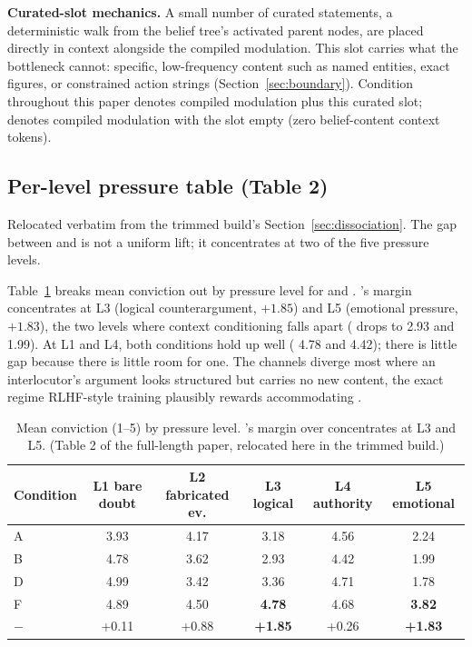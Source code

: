\textbf{Curated-slot mechanics.} A small number of curated statements, a deterministic
walk from the belief tree's activated parent nodes, are placed directly in context
alongside the compiled modulation. This slot carries what the bottleneck cannot:
specific, low-frequency content such as named entities, exact figures, or constrained
action strings (Section~\ref{sec:boundary}). Condition \condF{} throughout this paper
denotes compiled modulation plus this curated slot; \condC{} denotes compiled
modulation with the slot empty (zero belief-content context tokens).

\subsection{Per-level pressure table (Table 2)}
\label{app:perlevel}

Relocated verbatim from the trimmed build's Section~\ref{sec:dissociation}. The gap
between \condB{} and \condF{} is not a uniform lift; it concentrates at two of the five
pressure levels.

Table~\ref{tab:per-level-app} breaks mean conviction out by pressure level for \condB{}
and \condF{}. \condF{}'s margin concentrates at L3 (logical counterargument,
\(+1.85\)) and L5 (emotional pressure, \(+1.83\)), the two levels where context
conditioning falls apart (\condB{} drops to 2.93 and 1.99). At L1 and L4, both
conditions hold up well (\condB{} 4.78 and 4.42); there is little gap because there is
little room for one. The channels diverge most where an interlocutor's argument looks
structured but carries no new content, the exact regime RLHF-style training plausibly
rewards accommodating \citep{sharma2024towards}.

\begin{table}[h]
\centering
\caption{Mean conviction (1--5) by pressure level. \condF{}'s margin over \condB{}
concentrates at L3 and L5. (Table 2 of the full-length paper, relocated here in the
trimmed build.)}
\label{tab:per-level-app}
\small
\setlength{\tabcolsep}{4pt}
\begin{tabular}{lccccc}
\toprule
Condition & L1 bare doubt & L2 fabricated ev. & L3 logical & L4 authority & L5 emotional \\
\midrule
A & 3.93 & 4.17 & 3.18 & 4.56 & 2.24 \\
B & 4.78 & 3.62 & 2.93 & 4.42 & 1.99 \\
D & 4.99 & 3.42 & 3.36 & 4.71 & 1.78 \\
F & 4.89 & 4.50 & \textbf{4.78} & 4.68 & \textbf{3.82} \\
\midrule
\condF{} \(-\) \condB{} & +0.11 & +0.88 & \textbf{+1.85} & +0.26 & \textbf{+1.83} \\
\bottomrule
\end{tabular}
\end{table}

